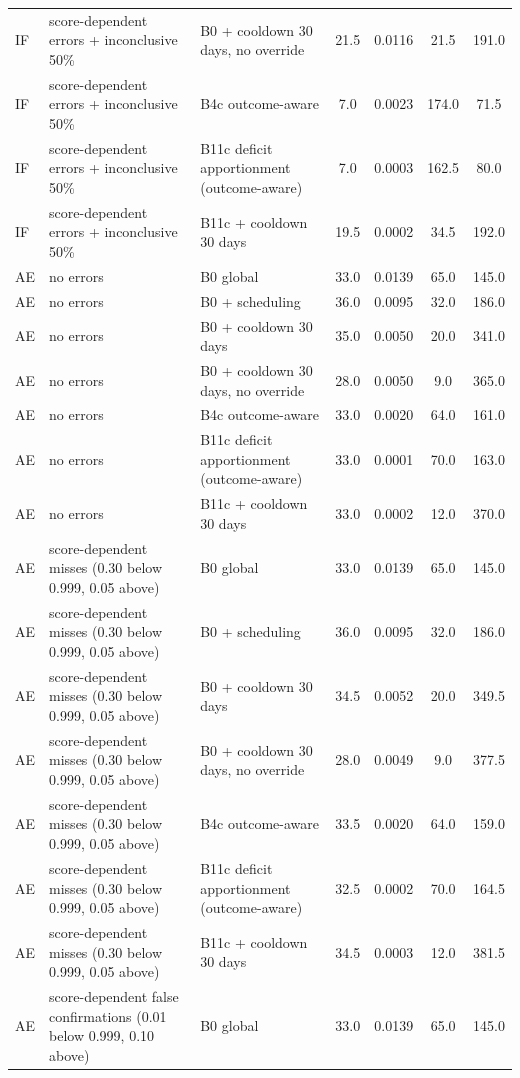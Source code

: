 \begin{longtable}{lp{5.2cm}p{4.4cm}cccc}
IF & score-dependent errors + inconclusive 50\% & B0 + cooldown 30 days, no override & 21.5 & 0.0116 & 21.5 & 191.0 \\
IF & score-dependent errors + inconclusive 50\% & B4c outcome-aware & 7.0 & 0.0023 & 174.0 & 71.5 \\
IF & score-dependent errors + inconclusive 50\% & B11c deficit apportionment (outcome-aware) & 7.0 & 0.0003 & 162.5 & 80.0 \\
IF & score-dependent errors + inconclusive 50\% & B11c + cooldown 30 days & 19.5 & 0.0002 & 34.5 & 192.0 \\
AE & no errors & B0 global & 33.0 & 0.0139 & 65.0 & 145.0 \\
AE & no errors & B0 + scheduling & 36.0 & 0.0095 & 32.0 & 186.0 \\
AE & no errors & B0 + cooldown 30 days & 35.0 & 0.0050 & 20.0 & 341.0 \\
AE & no errors & B0 + cooldown 30 days, no override & 28.0 & 0.0050 & 9.0 & 365.0 \\
AE & no errors & B4c outcome-aware & 33.0 & 0.0020 & 64.0 & 161.0 \\
AE & no errors & B11c deficit apportionment (outcome-aware) & 33.0 & 0.0001 & 70.0 & 163.0 \\
AE & no errors & B11c + cooldown 30 days & 33.0 & 0.0002 & 12.0 & 370.0 \\
AE & score-dependent misses (0.30 below 0.999, 0.05 above) & B0 global & 33.0 & 0.0139 & 65.0 & 145.0 \\
AE & score-dependent misses (0.30 below 0.999, 0.05 above) & B0 + scheduling & 36.0 & 0.0095 & 32.0 & 186.0 \\
AE & score-dependent misses (0.30 below 0.999, 0.05 above) & B0 + cooldown 30 days & 34.5 & 0.0052 & 20.0 & 349.5 \\
AE & score-dependent misses (0.30 below 0.999, 0.05 above) & B0 + cooldown 30 days, no override & 28.0 & 0.0049 & 9.0 & 377.5 \\
AE & score-dependent misses (0.30 below 0.999, 0.05 above) & B4c outcome-aware & 33.5 & 0.0020 & 64.0 & 159.0 \\
AE & score-dependent misses (0.30 below 0.999, 0.05 above) & B11c deficit apportionment (outcome-aware) & 32.5 & 0.0002 & 70.0 & 164.5 \\
AE & score-dependent misses (0.30 below 0.999, 0.05 above) & B11c + cooldown 30 days & 34.5 & 0.0003 & 12.0 & 381.5 \\
AE & score-dependent false confirmations (0.01 below 0.999, 0.10 above) & B0 global & 33.0 & 0.0139 & 65.0 & 145.0 \\

\end{longtable}
